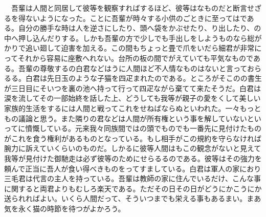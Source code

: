 \documentclass[a5j]{ltjbook}
\begin{document}
　吾輩は人間と同居して彼等を観察すればするほど、彼等はなものだと断言せざるを得ないようになった。ことに吾輩が時々する小供のごときに至ってはである。自分の勝手な時は人を逆さにしたり、頭へ袋をかぶせたり、り出したり、の中へ押し込んだりする。しかも吾輩の方で少しでも手出しをしようものなら総がかりで追い廻して迫害を加える。この間もちょっと畳で爪をいだら細君が非常にってそれから容易に座敷へれない。台所の板の間でがえていても平気なものである。吾輩の尊敬するの白君などはうに人間ほど不人情なものはないと言っておらるる。白君は先日玉のような子猫を四疋まれたのである。ところがそこのの書生が三日目にそいつを裏の池へ持って行って四疋ながら棄てて来たそうだ。白君は涙を流してその一部始終を話した上、どうしても我等が親子の愛をくして美しい家族的生活をするには人間と戦ってこれをせねばならぬといわれた。一々もっともの議論と思う。また隣りの君などは人間が所有権という事を解していないといってに憤慨している。元来我々同族間ではの頭でものでも一番先に見付けたものがこれを食う権利があるものとなっている。もし相手がこの規約を守らなければ腕力に訴えていくらいのものだ。しかるに彼等人間はもこの観念がないと見えて我等が見付けた御馳走は必ず彼等のためにせらるるのである。彼等はその強力を頼んで正当に吾人が食い得べきものをってすましている。白君は軍人の家におり三毛君は代言の主人を持っている。吾輩は教師の家に住んでいるだけ、こんな事に関すると両君よりもむしろ楽天である。ただその日その日がどうにかこうにか送られればよい。いくら人間だって、そういつまでも栄える事もあるまい。まあ気を永く猫の時節を待つがよかろう。 \newline
\end{document}
